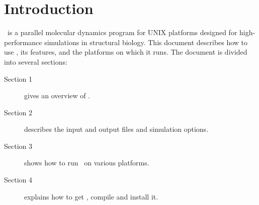 
%
%
%
%
%
%
%
%
%
%
%
% 
% 
% 
% 


\section{Introduction}
\label{section:intro}

\NAMD\ is a parallel molecular dynamics program for UNIX 
platforms designed for high-performance 
simulations in structural biology.  This document describes how to use 
\NAMD, its features, and the platforms on which it runs.
The document is divided into several sections:
\begin{description}
\item[Section 1] gives an overview of \NAMD. 
\item[Section 2] describes the input and output files and simulation options. 
\item[Section 3] shows how to run \NAMD\ on various platforms.
\item[Section 4] explains how to get \NAMD, compile and install it.
\end{description}

